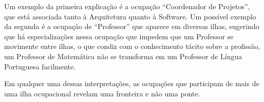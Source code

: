 \documentclass[12pt,a4paper]{article}
\begin{document}
Um exemplo da primeira explicação é a ocupação \enquote{Coordenador de Projetos}, que está associada tanto à Arquitetura quanto à Software. Um possível exemplo da segunda é a ocupação de \enquote{Professor} que aparece em diversas ilhas, sugerindo que há especializações nessa ocupação que impedem que um Professor se movimente entre ilhas, o que condiz com o conhecimento tácito sobre a profissão, um Professor de Matemática não se transforma em um Professor de Língua Portuguesa facilmente.

Em qualquer uma dessas interpretações, as ocupações que participam de mais de uma ilha ocupacional revelam uma fronteira e não uma ponte.

\end{document}

